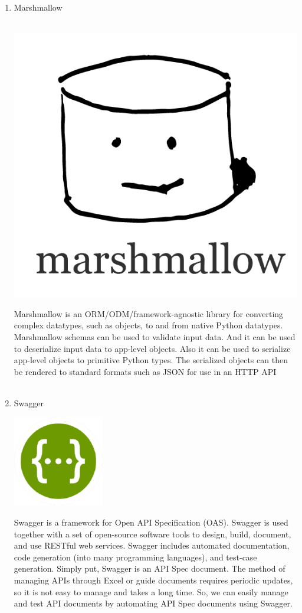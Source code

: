 \documentclass[conference]{IEEEtran}
\begin{document}
\begin{enumerate}
    \item Marshmallow \\ \\
    \centerline{\includegraphics [scale=0.3] {assets/marshmallow.png}}
    Marshmallow is an ORM/ODM/framework-agnostic library for converting complex datatypes, such as objects, to and from native Python datatypes. Marshmallow schemas can be used to validate input data. And it can be used to deserialize input data to app-level objects. Also it can be used to serialize app-level objects to primitive Python types. The serialized objects can then be rendered to standard formats such as JSON for use in an HTTP API \\ \\
    
    \item Swagger \\ 
    \centerline{\includegraphics{assets/Swagger.png}}
    Swagger is a framework for Open API Specification (OAS). Swagger is used together with a set of open-source software tools to design, build, document, and use RESTful web services. Swagger includes automated documentation, code generation (into many programming languages), and test-case generation. Simply put, Swagger is an API Spec document. The method of managing APIs through Excel or guide documents requires periodic updates, so it is not easy to manage and takes a long time. So, we can easily manage and test API documents by automating API Spec documents using Swagger. \\ \\   


\end{enumerate}
\end{document}
